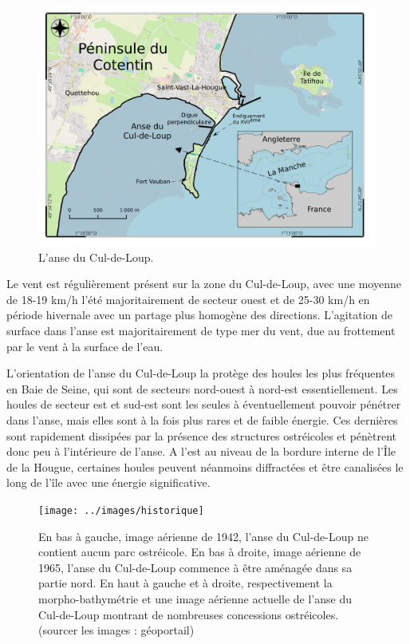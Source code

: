 \documentclass[10pt,a4paper,titlepage]{article}
\begin{document}
    \begin{figure}[!h]
        \centering
        \includegraphics[width=0.8\linewidth]{../images/carte-ADCL}
        \caption[anse du Cul-de-Loup.]{L'anse du Cul-de-Loup.}
        \label{fig:carte-adcl}
    \end{figure}
    
    Le vent est régulièrement présent sur la zone du Cul-de-Loup, avec une moyenne de 18-19 km/h l'été majoritairement de secteur ouest et de 25-30 km/h en période hivernale avec un partage plus homogène des directions. L'agitation de surface dans l'anse est majoritairement de type mer du vent, due au frottement par le vent à la surface de l'eau.
    
    L'orientation de l'anse du Cul-de-Loup la protège des houles les plus fréquentes en Baie de Seine, qui sont de secteurs nord-ouest à nord-est essentiellement. Les houles de secteur est et sud-est sont les seules à éventuellement pouvoir pénétrer dans l'anse, mais elles sont à la fois plus rares et de faible énergie. Ces dernières sont rapidement dissipées par la présence des structures ostréicoles et pénètrent donc peu à l'intérieure de l'anse. A l'est au niveau de la bordure interne de l'Île de la Hougue, certaines houles peuvent néanmoins diffractées et être canalisées le long de l'île avec une énergie significative.
    
    \begin{figure}[!h]
        \centering
        \texttt{[image: ../images/historique]}
        \caption[Évolution de l'anse du Cul-de-Loup]{En bas à gauche, image aérienne de 1942, l'anse du Cul-de-Loup ne contient aucun parc ostréicole. En bas à droite, image aérienne de 1965, l'anse du Cul-de-Loup commence à être aménagée dans sa partie nord. En haut à gauche et à droite, respectivement la morpho-bathymétrie  et une image aérienne actuelle de l'anse du Cul-de-Loup montrant de nombreuses concessions ostréicoles. (sourcer les images : géoportail)}
        \label{fig:historique-adcl}
    \end{figure}
    
\end{document}
